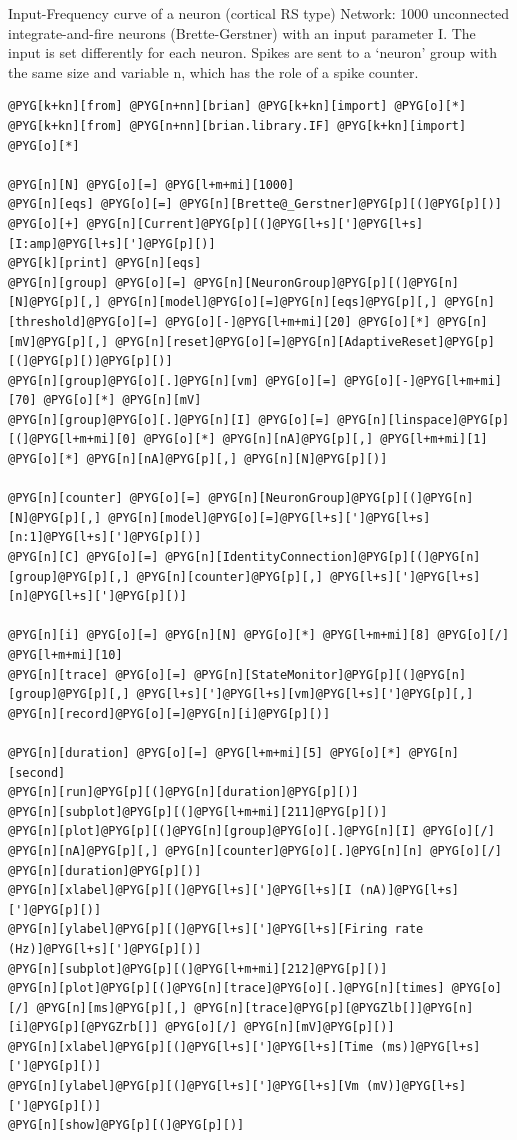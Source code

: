 \documentclass[letterpaper,10pt,english]{manual}
\begin{document}
Input-Frequency curve of a neuron (cortical RS type)
Network: 1000 unconnected integrate-and-fire neurons (Brette-Gerstner)
with an input parameter I.
The input is set differently for each neuron.
Spikes are sent to a `neuron' group with the same size and variable n,
which has the role of a spike counter.

\begin{Verbatim}[commandchars=@\[\]]
@PYG[k+kn][from] @PYG[n+nn][brian] @PYG[k+kn][import] @PYG[o][*]
@PYG[k+kn][from] @PYG[n+nn][brian.library.IF] @PYG[k+kn][import] @PYG[o][*]

@PYG[n][N] @PYG[o][=] @PYG[l+m+mi][1000]
@PYG[n][eqs] @PYG[o][=] @PYG[n][Brette@_Gerstner]@PYG[p][(]@PYG[p][)] @PYG[o][+] @PYG[n][Current]@PYG[p][(]@PYG[l+s][']@PYG[l+s][I:amp]@PYG[l+s][']@PYG[p][)]
@PYG[k][print] @PYG[n][eqs]
@PYG[n][group] @PYG[o][=] @PYG[n][NeuronGroup]@PYG[p][(]@PYG[n][N]@PYG[p][,] @PYG[n][model]@PYG[o][=]@PYG[n][eqs]@PYG[p][,] @PYG[n][threshold]@PYG[o][=] @PYG[o][-]@PYG[l+m+mi][20] @PYG[o][*] @PYG[n][mV]@PYG[p][,] @PYG[n][reset]@PYG[o][=]@PYG[n][AdaptiveReset]@PYG[p][(]@PYG[p][)]@PYG[p][)]
@PYG[n][group]@PYG[o][.]@PYG[n][vm] @PYG[o][=] @PYG[o][-]@PYG[l+m+mi][70] @PYG[o][*] @PYG[n][mV]
@PYG[n][group]@PYG[o][.]@PYG[n][I] @PYG[o][=] @PYG[n][linspace]@PYG[p][(]@PYG[l+m+mi][0] @PYG[o][*] @PYG[n][nA]@PYG[p][,] @PYG[l+m+mi][1] @PYG[o][*] @PYG[n][nA]@PYG[p][,] @PYG[n][N]@PYG[p][)]

@PYG[n][counter] @PYG[o][=] @PYG[n][NeuronGroup]@PYG[p][(]@PYG[n][N]@PYG[p][,] @PYG[n][model]@PYG[o][=]@PYG[l+s][']@PYG[l+s][n:1]@PYG[l+s][']@PYG[p][)]
@PYG[n][C] @PYG[o][=] @PYG[n][IdentityConnection]@PYG[p][(]@PYG[n][group]@PYG[p][,] @PYG[n][counter]@PYG[p][,] @PYG[l+s][']@PYG[l+s][n]@PYG[l+s][']@PYG[p][)]

@PYG[n][i] @PYG[o][=] @PYG[n][N] @PYG[o][*] @PYG[l+m+mi][8] @PYG[o][/] @PYG[l+m+mi][10]
@PYG[n][trace] @PYG[o][=] @PYG[n][StateMonitor]@PYG[p][(]@PYG[n][group]@PYG[p][,] @PYG[l+s][']@PYG[l+s][vm]@PYG[l+s][']@PYG[p][,] @PYG[n][record]@PYG[o][=]@PYG[n][i]@PYG[p][)]

@PYG[n][duration] @PYG[o][=] @PYG[l+m+mi][5] @PYG[o][*] @PYG[n][second]
@PYG[n][run]@PYG[p][(]@PYG[n][duration]@PYG[p][)]
@PYG[n][subplot]@PYG[p][(]@PYG[l+m+mi][211]@PYG[p][)]
@PYG[n][plot]@PYG[p][(]@PYG[n][group]@PYG[o][.]@PYG[n][I] @PYG[o][/] @PYG[n][nA]@PYG[p][,] @PYG[n][counter]@PYG[o][.]@PYG[n][n] @PYG[o][/] @PYG[n][duration]@PYG[p][)]
@PYG[n][xlabel]@PYG[p][(]@PYG[l+s][']@PYG[l+s][I (nA)]@PYG[l+s][']@PYG[p][)]
@PYG[n][ylabel]@PYG[p][(]@PYG[l+s][']@PYG[l+s][Firing rate (Hz)]@PYG[l+s][']@PYG[p][)]
@PYG[n][subplot]@PYG[p][(]@PYG[l+m+mi][212]@PYG[p][)]
@PYG[n][plot]@PYG[p][(]@PYG[n][trace]@PYG[o][.]@PYG[n][times] @PYG[o][/] @PYG[n][ms]@PYG[p][,] @PYG[n][trace]@PYG[p][@PYGZlb[]]@PYG[n][i]@PYG[p][@PYGZrb[]] @PYG[o][/] @PYG[n][mV]@PYG[p][)]
@PYG[n][xlabel]@PYG[p][(]@PYG[l+s][']@PYG[l+s][Time (ms)]@PYG[l+s][']@PYG[p][)]
@PYG[n][ylabel]@PYG[p][(]@PYG[l+s][']@PYG[l+s][Vm (mV)]@PYG[l+s][']@PYG[p][)]
@PYG[n][show]@PYG[p][(]@PYG[p][)]
\end{Verbatim}
\end{document}
